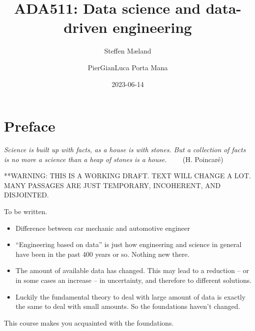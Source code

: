 \documentclass[
  a4paper,
  DIV=11,
  numbers=noendperiod,
  oneside]{scrreprt}
\title{ADA511: Data science and data-driven engineering}
\author{Steffen Mæland \and PierGianLuca Porta Mana}
\date{2023-06-14}
\renewcommand*\contentsname{Table of contents}
\newcommand\contentsname{Table of contents}
\begin{document}
\maketitle
\ifdefined\Shaded\renewenvironment{Shaded}{\begin{tcolorbox}[borderline west={3pt}{0pt}{shadecolor}, frame hidden, interior hidden, breakable, boxrule=0pt, sharp corners, enhanced]}{\end{tcolorbox}}\fi

\renewcommand*\contentsname{Table of contents}
{
\hypersetup{linkcolor=}
\setcounter{tocdepth}{2}
\tableofcontents
}

\hypertarget{preface}{%
\chapter*{Preface}\label{preface}}


\hfill\break
\hfill\break
\hfill\break
\hfill\break
\hfill\break
\hfill\break

\emph{Science is built up with facts, as a house is with stones. But a
collection of facts is no more a science than a heap of stones is a
house.} ~~~~{(H. Poincaré)}

**WARNING: THIS IS A WORKING DRAFT. TEXT WILL CHANGE A LOT. MANY
PASSAGES ARE JUST TEMPORARY, INCOHERENT, AND DISJOINTED.

To be written.

\begin{itemize}
\item
  Difference between car mechanic and automotive engineer
\item
  ``Engineering based on data'' is just how engineering and science in
  general have been in the past 400 years or so. Nothing new there.
\item
  The amount of available data has changed. This may lead to a reduction
  -- or in some cases an increase -- in uncertainty, and therefore to
  different solutions.
\item
  Luckily the fundamental theory to deal with large amount of data is
  exactly the same to deal with small amounts. So the foundations
  haven't changed.
\end{itemize}

This course makes you acquainted with the foundations.

\end{document}
